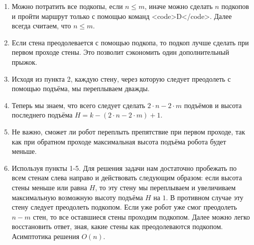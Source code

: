 \solutionSection

\begin{enumerate}
\item Можно потратить все подкопы, если $n \le m$, иначе можно сделать $n$ подкопов и пройти маршрут только с помощью команд <code>D</code>. Далее всегда считаем, что $n \le m$.
\item Если стена преодолевается с помощью подкопа, то подкоп лучше сделать при первом проходе стены. Это позволит сэкономить один дополнительный прыжок.
\item Исходя из пункта 2, каждую стену, через которую следует преодолеть с помощью подъёма, мы переплываем дважды.
\item Теперь мы знаем, что всего следует сделать $2 \cdot n - 2 \cdot m$ подъёмов и высота последнего подъёма $H = k - (2 \cdot n - 2 \cdot m) + 1$.
\item Не важно, сможет ли робот переплыть препятствие при первом проходе, так как при обратном проходе максимальная высота подъёма робота будет меньше.
\item Используя пункты 1-5. Для решения задачи нам достаточно пробежать по всем стенам слева направо и действовать следующим образом: если высота стены меньше или равна $H$, то эту стену мы переплываем и увеличиваем максимальную возможную высоту подъёма $H$ на $1$. В противном случае эту стену следует преодолеть подкопом. Если уже робот уже смог преодолеть $n - m$ стен, то все оставшиеся стены проходим подкопом. Далее можно легко восстановить ответ, зная, какие стены как преодолеваются подкопом. Асимптотика решения $O(n)$.
\end{enumerate}

\codeExample

